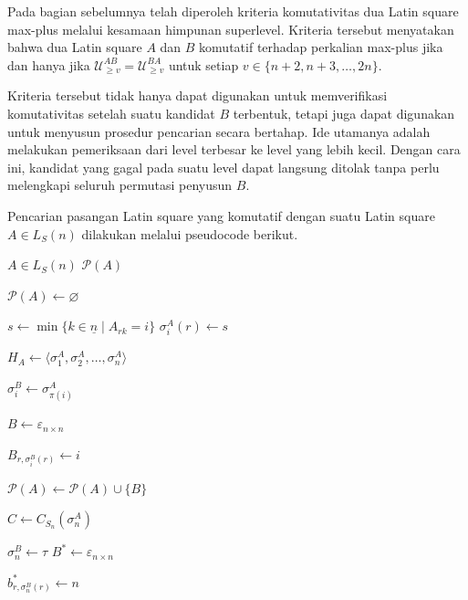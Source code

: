 Pada bagian sebelumnya telah diperoleh kriteria komutativitas dua Latin square max-plus melalui kesamaan himpunan superlevel. Kriteria tersebut menyatakan bahwa dua Latin square $A$ dan $B$ komutatif terhadap perkalian max-plus jika dan hanya jika $\mathcal{U}_{\ge v}^{AB}=\mathcal{U}_{\ge v}^{BA}$ untuk setiap $v\in\{n+2,n+3,\ldots,2n\}$.

Kriteria tersebut tidak hanya dapat digunakan untuk memverifikasi komutativitas setelah suatu kandidat $B$ terbentuk, tetapi juga dapat digunakan untuk menyusun prosedur pencarian secara bertahap. Ide utamanya adalah melakukan pemeriksaan dari level terbesar ke level yang lebih kecil. Dengan cara ini, kandidat yang gagal pada suatu level dapat langsung ditolak tanpa perlu melengkapi seluruh permutasi penyusun $B$.

\begin{algoritma}\label{alg:pencarian_pasangan_latin_square_komutatif}
  Pencarian pasangan Latin square yang komutatif dengan suatu Latin square $A\in L_S(n)$ dilakukan melalui pseudocode berikut.
  \begin{algorithm}
    \begin{algorithmic}[1]
      \Require $A\in L_S(n)$
      \Ensure $\mathcal{P}(A)$

      \State $\mathcal{P}(A)\gets\varnothing$

      \State $s\gets\min\{k\in \underline{n}\mid A_{rk}=i\}$
      \State $\sigma_i^A(r)\gets s$
      \EndFor
      \EndFor

      \State $H_A\gets\langle\sigma_1^A,\sigma_2^A,\ldots,\sigma_n^A\rangle$

      \State $\sigma_i^B\gets\sigma_{\pi(i)}^A$
      \EndFor

      \State $B\gets\varepsilon_{n\times n}$

      \State $B_{r,\sigma_i^B(r)}\gets i$
      \EndFor
      \EndFor

      \State $\mathcal{P}(A)\gets\mathcal{P}(A)\cup\{B\}$
      \EndFor
      \EndIf

      \State $C\gets C_{S_n}(\sigma_n^A)$

      \State $\sigma_n^B\gets\tau$
      \State $B^*\gets\varepsilon_{n\times n}$

      \State $b^*_{r,\sigma_n^B(r)}\gets n$
      \EndFor


\end{algorithmic}
\end{algorithm}
\end{algoritma}
